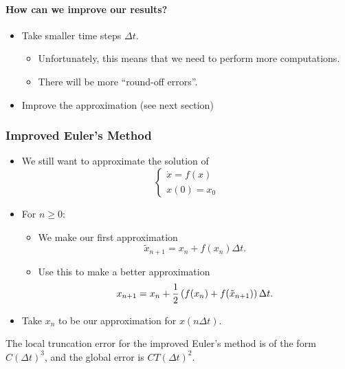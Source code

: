 \documentclass[class=article, crop=false]{standalone}
\begin{document}
  \paragraph{How can we improve our results?}
  \begin{itemize}
    \item Take smaller time steps $\Delta t$.
    \begin{itemize}
      \item Unfortunately, this means that we need to perform more computations.
      \item There will be more ``round-off errors''.
    \end{itemize}
    \item Improve the approximation (see next section)
  \end{itemize}
  \subsubsection{Improved Euler's Method}
  \begin{itemize}
    \item We still want to approximate the solution of
    \[
      \begin{cases}
        \dot{x} = f(x) \\
        x(0) = x_0
      \end{cases}
    \]
    \item For $n\geq 0$:
    \begin{itemize}
      \item We make our first approximation
      \[
        \tilde x_{n + 1} = x_n + f(x_n)\Delta t.
      \]
      \item Use this to make a better approximation
      \[
        x_{n + 1} = x_n + \frac{1}{2} \left( f(x_n) + f(\tilde x_{n + 1}) \right)\Delta t.
      \]
    \end{itemize}
    \item Take $x_n$ to be our approximation for $x(n\Delta t)$.
  \end{itemize}
  The local truncation error for the improved Euler's method is of the form $C(\Delta t)^3$, and the global error is $CT(\Delta t)^2$.
\end{document}
